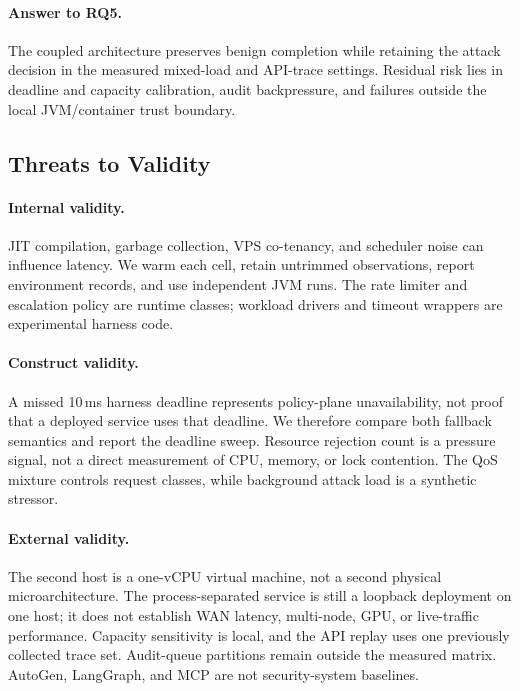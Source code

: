 \paragraph{Answer to RQ5.}
The coupled architecture preserves benign completion while retaining the
attack decision in the measured mixed-load and API-trace settings. Residual
risk lies in deadline and capacity calibration, audit backpressure, and
failures outside the local JVM/container trust boundary.

\subsection{Threats to Validity}

\paragraph{Internal validity.}
JIT compilation, garbage collection, VPS co-tenancy, and scheduler noise can
influence latency. We warm each cell, retain untrimmed observations, report
environment records, and use independent JVM runs. The rate limiter and
escalation policy are runtime classes; workload drivers and timeout
wrappers are experimental harness code.

\paragraph{Construct validity.}
A missed 10\,ms harness deadline represents policy-plane unavailability, not
proof that a deployed service uses that deadline. We therefore compare both
fallback semantics and report the deadline sweep. Resource rejection count is
a pressure signal, not a direct measurement of CPU, memory, or lock
contention. The QoS mixture controls request classes, while background attack
load is a synthetic stressor.

\paragraph{External validity.}
The second host is a one-vCPU virtual machine, not a second physical
microarchitecture. The process-separated service is still a loopback
deployment on one host; it does not establish WAN latency, multi-node, GPU, or
live-traffic performance. Capacity sensitivity is local, and the API
replay uses one previously collected trace set. Audit-queue partitions remain
outside the measured matrix. AutoGen, LangGraph, and MCP are not
security-system baselines.
